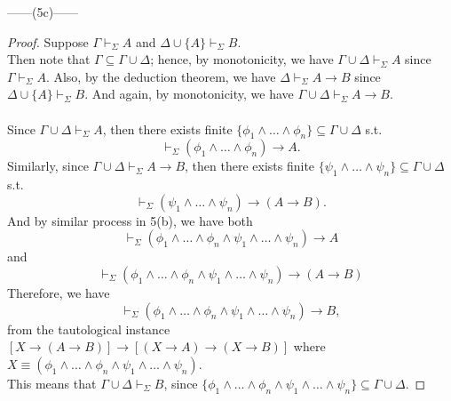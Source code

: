 \documentclass[12pt]{article}
\newcommand{\dr}{\vdash_{\Sigma}}
\begin{document}
\noindent
\begin{center}
    ------(5c)------
\end{center} 
\begin{proof}
    Suppose $\Gamma \dr A$ and $\Delta \cup \{A\} \dr B$.\\
    Then note that $\Gamma \subseteq \Gamma \cup \Delta$; hence, by monotonicity, we have $\Gamma \cup \Delta \dr A$ since $\Gamma \dr A$.
    Also, by the deduction theorem, we have $\Delta \dr A \to B$ since $\Delta \cup \{A\} \dr B$.
    And again, by monotonicity, we have $\Gamma \cup \Delta \dr A \to B$.\\
    \\
    Since $\Gamma \cup \Delta \dr A$, then there exists finite $\{\phi_1 \land \dots \land \phi_n\} \subseteq \Gamma \cup \Delta$ s.t. 
    $$\dr (\phi_1 \land \dots \land \phi_n) \to A.$$
    Similarly, since $\Gamma \cup \Delta \dr A \to B$, then there exists finite $\{\psi_1 \land \dots \land \psi_n\} \subseteq \Gamma \cup \Delta$ s.t. 
    $$\dr (\psi_1 \land \dots \land \psi_n) \to (A \to B).$$
    And by similar process in 5(b), we have both
    $$\dr (\phi_1 \land \dots \land \phi_n \land \psi_1 \land \dots \land \psi_n) \to A$$ and
    $$\dr (\phi_1 \land \dots \land \phi_n \land \psi_1 \land \dots \land \psi_n) \to (A \to B)$$
    Therefore, we have
    $$\dr (\phi_1 \land \dots \land \phi_n \land \psi_1 \land \dots \land \psi_n) \to B,$$
    from the tautological instance $[X \to (A \to B)] \to [(X \to A) \to (X \to B)]$ where $X \equiv (\phi_1 \land \dots \land \phi_n \land \psi_1 \land \dots \land \psi_n)$.\\
    This means that $\Gamma \cup \Delta \dr B$, since $\{\phi_1 \land \dots \land \phi_n \land \psi_1 \land \dots \land \psi_n\} \subseteq \Gamma \cup \Delta$.
\end{proof}
\end{document}

